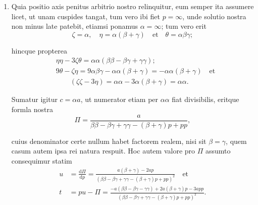 \documentclass[10pt,a4paper]{article}
\def\D{\mathrm{d}}
\begin{document}
\begin{paracol}{2}
\begin{enumerate}[topsep=1px]
		\item Quia positio axis penitus arbitrio nostro relinquitur, eum semper ita assumere licet, ut unam cuspides tangat, tum vero ibi fiet $p=\infty$, unde solutio nostra non minus late patebit, etiamsi ponamus $\alpha = \infty$; tum vero erit
		\[
			\zeta = \alpha, \quad \eta = \alpha(\beta+ \gamma)\quad \text{et}\quad  \theta = \alpha \beta \gamma;
		\]
		\par hincque propterea
		\begin{align*}
			&\eta \eta - 3\zeta \theta = \alpha \alpha (\beta \beta - \beta \gamma + \gamma \gamma);\\
			&9\theta - \zeta\eta = 9\alpha \beta \gamma - \alpha \alpha(\beta + \gamma) = - \alpha \alpha (\beta + \gamma)\quad \text{et}\\
			&\qquad (\zeta \zeta - 3\eta) = \alpha \alpha - 3\alpha (\beta + \gamma) = \alpha \alpha.
		\end{align*}
		\par Sumatur igitur $c= \alpha a$, ut numerator etiam per $\alpha \alpha$ fiat divisibilis, eritque formla nostra
		\[
			\Pi = \frac{a}{\beta \beta -\beta \gamma+\gamma \gamma -(\beta + \gamma)p + pp},
		\]
		\par cuius denominator certe nullum habet factorem realem, nisi sit $\beta = \gamma$, quem casum autem ipsa rei natura respuit. Hoc autem valore pro $\Pi$ assumto consequimur statim
		\begin{align*}
			u &= \frac{\D \Pi}{\D p} = \frac{a(\beta + \gamma)-2ap}{(\beta \beta -\beta \gamma +\gamma \gamma - (\beta+\gamma)p+pp)^2} \quad \text{et}\\
			t & = pu - \Pi = \frac{-a(\beta \beta - \beta \gamma-\gamma \gamma)+2a(\beta+\gamma)p -3app}{(\beta \beta - \beta \gamma + \gamma \gamma -(\beta + \gamma)p+pp)^2}.
		\end{align*}
		

\end{enumerate}
\end{paracol}
\end{document}
